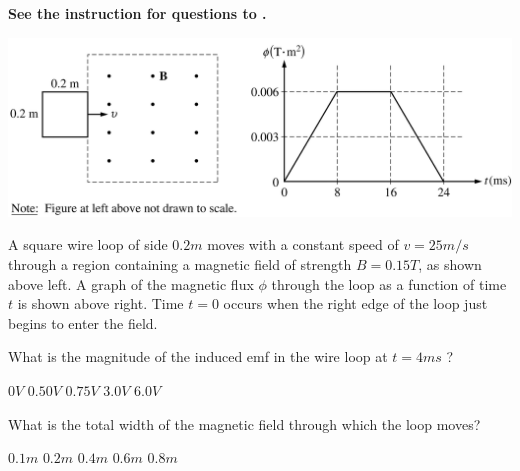 \textbf{See the instruction for questions  to .}

\begin{center}
\includegraphics[scale=0.25]{images/img-006-006.png}
\end{center}

A square wire loop of side $0.2 \unit{m}$ moves with a constant speed of $v=25 \unit{m/s}$ through a region containing a magnetic field of strength $B=0.15 \unit{T}$, as shown above left. A graph of the magnetic flux $\phi$ through the loop as a function of time $t$ is shown above right. Time $t=0$ occurs when the right edge of the loop just begins to enter the field.

\begin{questions}\setcounter{question}{8}\question
What is the magnitude of the induced emf in the wire loop at $t=4 \unit{ms}$ ?

\begin{oneparchoices}
\choice $0 \unit{V}$
\choice $0.50 \unit{V}$
\choice $0.75 \unit{V}$
\choice $3.0 \unit{V}$
\choice $6.0 \unit{V}$
\end{oneparchoices}\end{questions}

\begin{questions}\setcounter{question}{9}\question
What is the total width of the magnetic field through which the loop moves?

\begin{oneparchoices}
\choice $0.1 \unit{m}$
\choice $0.2 \unit{m}$
\choice $0.4 \unit{m}$
\choice $0.6 \unit{m}$
\choice $0.8 \unit{m}$
\end{oneparchoices}\end{questions}

